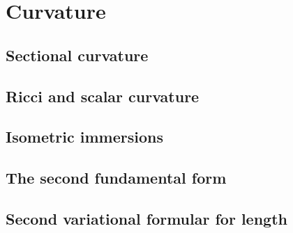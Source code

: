 \documentclass[letter-paper]{tufte-book}
\begin{document}

\chapter{Curvature}


\section{Sectional curvature}


\section{Ricci and scalar curvature}


\section{Isometric immersions}


\section{The second fundamental form}


\section{Second variational formular for length}










\mainmatter




%


\end{document}
